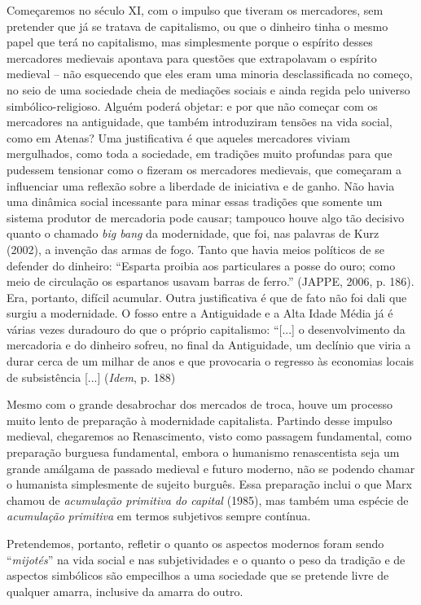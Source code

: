 Começaremos no século XI, com o impulso que tiveram os mercadores, sem
pretender que já se tratava de capitalismo, ou que o dinheiro tinha o
mesmo papel que terá no capitalismo, mas simplesmente porque o espírito
desses mercadores medievais apontava para questões que extrapolavam o
espírito medieval -- não esquecendo que eles eram uma minoria
desclassificada no começo, no seio de uma sociedade cheia de mediações
sociais e ainda regida pelo universo simbólico-religioso. Alguém poderá
objetar: e por que não começar com os mercadores na antiguidade, que
também introduziram tensões na vida social, como em Atenas? Uma
justificativa é que aqueles mercadores viviam mergulhados, como toda a
sociedade, em tradições muito profundas para que pudessem tensionar como
o fizeram os mercadores medievais, que começaram a influenciar uma
reflexão sobre a liberdade de iniciativa e de ganho. Não havia uma
dinâmica social incessante para minar essas tradições que somente um
sistema produtor de mercadoria pode causar; tampouco houve algo tão
decisivo quanto o chamado \emph{big bang} da modernidade, que foi, nas
palavras de Kurz (2002), a invenção das armas de fogo. Tanto que havia
meios políticos de se defender do dinheiro: ``Esparta proibia aos
particulares a posse do ouro; como meio de circulação os espartanos
usavam barras de ferro.'' (JAPPE, 2006, p. 186). Era, portanto, difícil
acumular. Outra justificativa é que de fato não foi dali que surgiu a
modernidade. O fosso entre a Antiguidade e a Alta Idade Média já é
várias vezes duradouro do que o próprio capitalismo: ``{[}...{]} o
desenvolvimento da mercadoria e do dinheiro sofreu, no final da
Antiguidade, um declínio que viria a durar cerca de um milhar de anos e
que provocaria o regresso às economias locais de subsistência {[}...{]}
(\emph{Idem}, p. 188)

Mesmo com o grande desabrochar dos mercados de troca, houve um processo
muito lento de preparação à modernidade capitalista. Partindo desse
impulso medieval, chegaremos ao Renascimento, visto como passagem
fundamental, como preparação burguesa fundamental, embora o humanismo
renascentista seja um grande amálgama de passado medieval e futuro
moderno, não se podendo chamar o humanista simplesmente de sujeito
burguês. Essa preparação inclui o que Marx chamou de \emph{acumulação
primitiva do capital} (1985), mas também uma espécie de
\emph{acumulação} \emph{primitiva} em termos subjetivos sempre contínua.

Pretendemos, portanto, refletir o quanto os aspectos modernos foram
sendo ``\emph{mijotés}'' na vida social e nas subjetividades e o quanto
o peso da tradição e de aspectos simbólicos são empecilhos a uma
sociedade que se pretende livre de qualquer amarra, inclusive da amarra
do outro.

